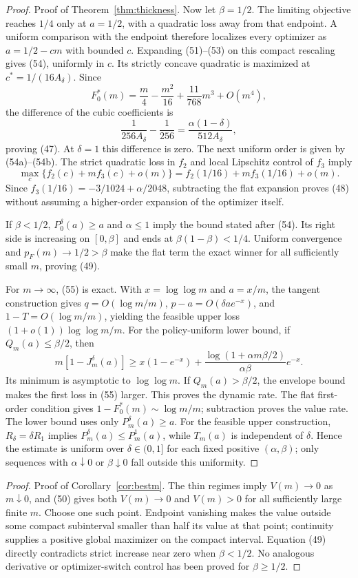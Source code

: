 \documentclass[mnsc,dblanonrev]{informs4}
\begin{document}
\begin{APPENDICES}
\begin{proof}{Proof of Theorem~\ref{thm:thickness}.}
Now let $\beta=1/2$.  The limiting objective reaches $1/4$ only at
$a=1/2$, with a quadratic loss away from that endpoint.  A uniform comparison
with the endpoint therefore localizes every optimizer as
$a=1/2-cm$ with bounded $c$.  Expanding (51)--(53) on this compact rescaling
gives (54), uniformly in $c$.  Its strictly concave quadratic is maximized at
$c^*=1/(16A_\delta)$.  Since
\[
 F_0^*(m)=\frac m4-\frac{m^2}{16}+\frac{11}{768}m^3+O(m^4),
\]
the difference of the cubic coefficients is
\[
 \frac1{256A_\delta}-\frac1{256}
 =\frac{\alpha(1-\delta)}{512A_\delta},
\]
proving (47).  At $\delta=1$ this difference is zero.  The next uniform
order is given by (54a)--(54b).  The strict quadratic loss in $f_2$ and
local Lipschitz control of $f_3$ imply
\[
 \max_c\{f_2(c)+mf_3(c)+o(m)\}
 =f_2(1/16)+mf_3(1/16)+o(m).
\]
Since $f_3(1/16)=-3/1024+\alpha/2048$, subtracting the flat expansion
proves (48) without assuming a higher-order expansion of the optimizer
itself.

If $\beta<1/2$, $P_0^\delta(a)\ge a$ and $\alpha\le1$ imply the bound stated
after (54).  Its right side is increasing on $[0,\beta]$ and ends at
$\beta(1-\beta)<1/4$.  Uniform convergence and $p_F(m)\to1/2>\beta$ make the
flat term the exact winner for all sufficiently small $m$, proving (49).

For $m\to\infty$, (55) is exact.  With $x=\log\log m$ and $a=x/m$, the
tangent construction gives $q=O(\log m/m)$,
$p-a=O(\delta a e^{-x})$, and $1-T=O(\log m/m)$, yielding the feasible upper
loss $(1+o(1))\log\log m/m$.  For the policy-uniform lower bound, if
$Q_m(a)\le\beta/2$, then
\[
 m[1-J_m^\delta(a)]\ge
 x(1-e^{-x})+
 \frac{\log(1+\alpha m\beta/2)}{\alpha\beta}e^{-x}.
\]
Its minimum is asymptotic to $\log\log m$.  If $Q_m(a)>\beta/2$, the
envelope bound makes the first loss in (55) larger.  This proves the dynamic
rate.  The flat first-order condition gives
$1-F_0^*(m)\sim\log m/m$; subtraction proves the value rate.  The lower
bound uses only $P_m^\delta(a)\ge a$.  For the feasible upper construction,
$R_\delta=\delta R_1$ implies $P_m^\delta(a)\le P_m^1(a)$, while
$T_m(a)$ is independent of $\delta$.  Hence the estimate is uniform over
$\delta\in(0,1]$ for each fixed positive $(\alpha,\beta)$; only sequences
with $\alpha\downarrow0$ or $\beta\downarrow0$ fall outside this uniformity.
\Halmos\end{proof}

\begin{proof}{Proof of Corollary~\ref{cor:bestm}.}
The thin regimes imply $V(m)\to0$ as $m\downarrow0$, and (50) gives both
$V(m)\to0$ and $V(m)>0$ for all sufficiently large finite $m$.  Choose one
such point.  Endpoint vanishing makes the value outside some compact
subinterval smaller than half its value at that point; continuity supplies a
positive global maximizer on the compact interval.  Equation (49) directly
contradicts strict increase near zero when $\beta<1/2$.  No analogous
derivative or optimizer-switch control has been proved for $\beta\ge1/2$.
\Halmos\end{proof}


\end{APPENDICES}
\end{document}
